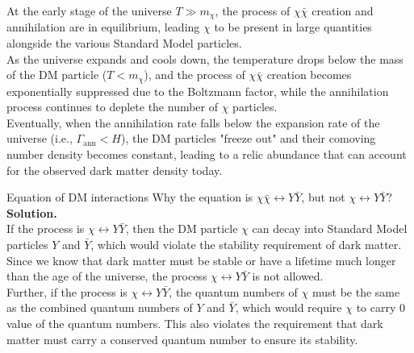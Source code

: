 \bigskip \noindent
\begin{intuition}
    At the early stage of the universe $T \gg m_\chi$, the process of $\chi \bar{\chi}$ creation and annihilation are in equilibrium, leading $\chi$ to be present in large quantities alongside the various Standard Model particles. \\
    
    As the universe expands and cools down, the temperature drops below the mass of the DM particle ($T < m_\chi$), and the process of $\chi \bar{\chi}$ creation becomes exponentially suppressed due to the Boltzmann factor, while the annihilation process continues to deplete the number of $\chi$ particles. \\
    
    Eventually, when the annihilation rate falls below the expansion rate of the universe (i.e., $\Gamma_{\mathrm{ann}} < H$), the DM particles "freeze out" and their comoving number density becomes constant, leading to a relic abundance that can account for the observed dark matter density today.
\end{intuition}

\begin{example}{ Equation of DM interactions}{}
    Why the equation is $\chi \bar{\chi} \leftrightarrow Y \bar{Y}$, but not $\chi \leftrightarrow Y \bar{Y}$? \\

    \bigskip\textbf{Solution.}\quad \\
    If the process is $\chi \leftrightarrow Y \bar{Y}$, then the DM particle $\chi$ can decay into Standard Model particles $Y$ and $\bar{Y}$, which would violate the stability requirement of dark matter. Since we know that dark matter must be stable or have a lifetime much longer than the age of the universe, the process $\chi \leftrightarrow Y \bar{Y}$ is not allowed. \\
    
    Further, if the process is $\chi \leftrightarrow Y \bar{Y}$, the quantum numbers of $\chi$ must be the same as the combined quantum numbers of $Y$ and $\bar{Y}$, which would require $\chi$ to carry 0 value of the quantum numbers. This also violates the requirement that dark matter must carry a conserved quantum number to ensure its stability.
\end{example}

\bigskip \noindent \bigskip \noindent \bigskip \noindent
